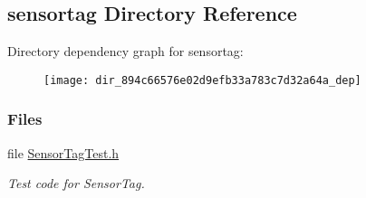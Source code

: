 \subsection{sensortag Directory Reference}
\label{dir_894c66576e02d9efb33a783c7d32a64a}
Directory dependency graph for sensortag\+:
\nopagebreak
\begin{figure}[H]
\begin{center}
\leavevmode
\texttt{[image: dir\_894c66576e02d9efb33a783c7d32a64a\_dep]}
\end{center}
\end{figure}
\subsubsection*{Files}
\begin{DoxyCompactItemize}
\item 
file \hyperlink{_sensor_tag_test_8h}{Sensor\+Tag\+Test.\+h}
\begin{DoxyCompactList}\small\item\em Test code for Sensor\+Tag. \end{DoxyCompactList}\end{DoxyCompactItemize}
